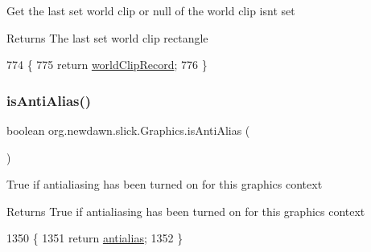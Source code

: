Get the last set world clip or null of the world clip isn\textquotesingle{}t set

\begin{DoxyReturn}{Returns}
The last set world clip rectangle 
\end{DoxyReturn}

\begin{DoxyCode}
774                                     \{
775         \textcolor{keywordflow}{return} \mbox{\hyperlink{classorg_1_1newdawn_1_1slick_1_1_graphics_a3f8e29a8ea45df15fdd48d536fe7cb4d}{worldClipRecord}};
776     \}
\end{DoxyCode}
\mbox{\label{classorg_1_1newdawn_1_1slick_1_1_graphics_aee336332347f6915a60ed9e34e171cc0}} 
\subsubsection{\texorpdfstring{is\+Anti\+Alias()}{isAntiAlias()}}
{\footnotesize\ttfamily boolean org.\+newdawn.\+slick.\+Graphics.\+is\+Anti\+Alias (\begin{DoxyParamCaption}{ }\end{DoxyParamCaption})\hspace{0.3cm}{\ttfamily [inline]}}

True if antialiasing has been turned on for this graphics context

\begin{DoxyReturn}{Returns}
True if antialiasing has been turned on for this graphics context 
\end{DoxyReturn}

\begin{DoxyCode}
1350                                  \{
1351         \textcolor{keywordflow}{return} \mbox{\hyperlink{classorg_1_1newdawn_1_1slick_1_1_graphics_a8ad14a02fea22933d2fc5b737433066a}{antialias}};
1352     \}
\end{DoxyCode}
\mbox{\label{classorg_1_1newdawn_1_1slick_1_1_graphics_a12d08ed83f89d831b864b10ea5769bbb}} 
